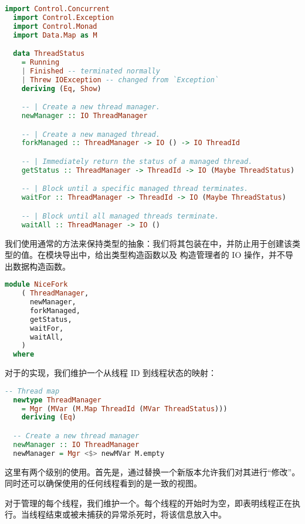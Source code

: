 \documentclass[./main.tex]{subfiles}
\begin{document}
\begin{lstlisting}[language=Haskell]
  import Control.Concurrent
  import Control.Exception
  import Control.Monad
  import Data.Map as M

  data ThreadStatus
    = Running
    | Finished -- terminated normally
    | Threw IOException -- changed from `Exception`
    deriving (Eq, Show)

    -- | Create a new thread manager.
    newManager :: IO ThreadManager

    -- | Create a new managed thread.
    forkManaged :: ThreadManager -> IO () -> IO ThreadId

    -- | Immediately return the status of a managed thread.
    getStatus :: ThreadManager -> ThreadId -> IO (Maybe ThreadStatus)

    -- | Block until a specific managed thread terminates.
    waitFor :: ThreadManager -> ThreadId -> IO (Maybe ThreadStatus)

    -- | Block until all managed threads terminate.
    waitAll :: ThreadManager -> IO ()
\end{lstlisting}

我们使用通常的方法来保持类型的抽象：我们将其包装在中，并防止用于创建该类型的值。在模块导出中，给出类型构造函数以及
构造管理者的 IO 操作，并不导出数据构造函数。

\begin{lstlisting}[language=Haskell]
  module NiceFork
    ( ThreadManager,
      newManager,
      forkManaged,
      getStatus,
      waitFor,
      waitAll,
    )
  where
\end{lstlisting}

对于的实现，我们维护一个从线程 ID 到线程状态的映射：

\begin{lstlisting}[language=Haskell]
  -- Thread map
  newtype ThreadManager
    = Mgr (MVar (M.Map ThreadId (MVar ThreadStatus)))
    deriving (Eq)

  -- Create a new thread manager
  newManager :: IO ThreadManager
  newManager = Mgr <$> newMVar M.empty
\end{lstlisting}

这里有两个级别的使用。首先是，通过替换一个新版本允许我们对其进行“修改”。同时还可以确保使用的任何线程看到的是一致的视图。

对于管理的每个线程，我们维护一个。每个线程的开始时为空，即表明线程正在执行。当线程结束或被未捕获的异常杀死时，将该信息放入中。
\end{document}
